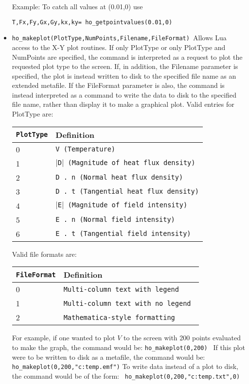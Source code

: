 \begin{itemize}
Example: To catch all values at (0.01,0) use

\texttt{T,Fx,Fy,Gx,Gy,kx,ky= ho\_getpointvalues(0.01,0) }

\item \texttt{ho\_makeplot(PlotType,NumPoints,Filename,FileFormat) }Allows Lua access
to the X-Y plot routines. If only PlotType or only PlotType and NumPoints
are specified, the command is interpreted as a request to plot the requested
plot type to the screen. If, in addition, the Filename parameter is
specified, the plot is instead written to disk to the specified file name as
an extended metafile. If the FileFormat parameter is also, the command is
instead interpreted as a command to write the data to disk to the specified
file name, rather than display it to make a graphical plot. Valid entries
for PlotType are:

\begin{tabular}{ll}
\texttt{PlotType} &  Definition \\ \hline
 0 & \texttt{V (Temperature)} \\
 1 & \texttt{$\vert$D$\vert$ (Magnitude of heat flux density)} \\
 2 & \texttt{D . n (Normal heat flux density)} \\
 3 & \texttt{D . t (Tangential heat flux density)} \\
 4 & \texttt{$\vert$E$\vert$ (Magnitude of field intensity)} \\
 5 & \texttt{E . n (Normal field intensity)} \\
 6 & \texttt{E . t (Tangential field intensity)}
\end{tabular}

\vspace*{8pt}
Valid file formats are:

\begin{tabular}{ll}
\texttt{FileFormat} &  Definition  \\ \hline
 0 & \texttt{Multi-column text with legend } \\
 1 & \texttt{Multi-column text with no legend } \\
 2 & \texttt{Mathematica-style formatting}
\end{tabular}

For example, if one wanted to plot $V $ to the screen with 200 points evaluated
to make the graph, the command would be: \newline
\texttt{ho\_makeplot(0,200) } \newline
If this plot were to be written to disk as a metafile, the command
would be:\texttt{ } \newline
\texttt{ho\_makeplot(0,200,"c:temp.emf")} \newline
To write data instead of a plot to disk, the command would be of
the form:\texttt{ } \newline
\texttt{ho\_makeplot(0,200,"c:temp.txt",0)} \newline



\end{itemize}
